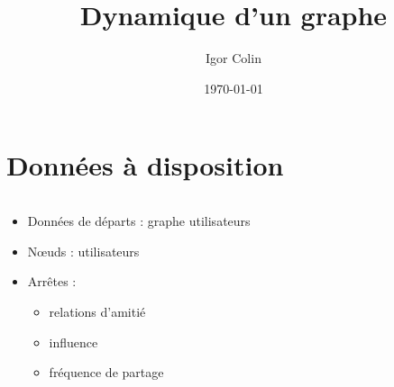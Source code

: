 \documentclass[c]{beamer}
\title{Dynamique d'un graphe}
\author{Igor Colin}
\date{\today}
\begin{document}
\maketitle

\section{Données à disposition}
\begin{frame}
    \begin{columns}
        \begin{column}{.5\textwidth}
            \begin{itemize}
                \item<1-> Données de départs : graphe utilisateurs
                \item<2-> N\oe{}uds : utilisateurs
                \item<3-> Arrêtes :
                    \begin{itemize}
                        \item<3-> relations d'amitié
                        \item<4-> influence
                        \item<5-> fréquence de partage
                    \end{itemize}
            \end{itemize}
        \end{column}
        \begin{column}{.5\textwidth}
\end{column}
\end{columns}
\end{frame}
\end{document}

